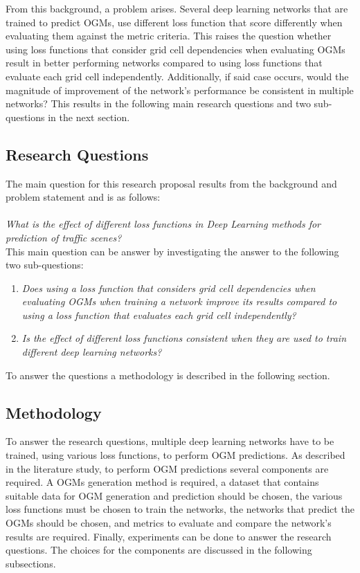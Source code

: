 From this background, a problem arises. Several deep learning networks that are trained to predict \glspl{OGM}, use different loss function that score differently when evaluating them against the metric criteria. This raises the question whether using loss functions that consider grid cell dependencies when evaluating \glspl{OGM} result in better performing networks compared to using loss functions that evaluate each grid cell independently. Additionally, if said case occurs, would the magnitude of improvement of the network's performance be consistent in multiple networks? This results in the following main research questions and two sub-questions in the next section. 

\subsection{Research Questions} \label{subsec:rp_questions}
The main question for this research proposal results from the background and problem statement and is as follows: \\ \\
\textit{What is the effect of different loss functions in Deep Learning methods for  prediction of traffic scenes?} \\

This main question can be answer by investigating the answer to the following two sub-questions:

\begin{enumerate}
	\item \textit{Does using a loss function that considers grid cell dependencies when evaluating \glspl{OGM} when training a network improve its results compared to using a loss function that evaluates each grid cell independently?}
	\item \textit{Is the effect of different loss functions consistent when they are used to train different deep learning networks?}
\end{enumerate}

To answer the questions a methodology is described in the following section.

\subsection{Methodology}  \label{subsec:rp_methodology}
To answer the research questions, multiple deep learning networks have to be trained, using various loss functions, to perform \gls{OGM} predictions. As described in the literature study, to perform \gls{OGM} predictions several components are required. A \glspl{OGM} generation method is required, a dataset that contains suitable data for \gls{OGM} generation and prediction should be chosen, the various loss functions must be chosen to train the networks, the networks that predict the \glspl{OGM} should be chosen, and metrics to evaluate and compare the network's results are required. Finally, experiments can be done to answer the research questions. The choices for the components are discussed in the following subsections. 

